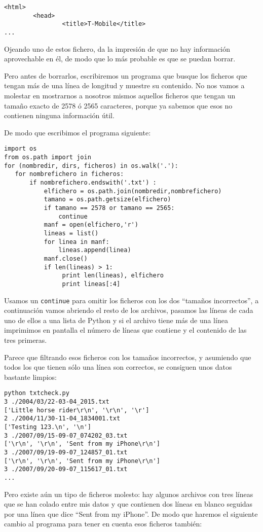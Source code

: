 \beforeverb
\begin{verbatim}
<html>
        <head>
                <title>T-Mobile</title>
...
\end{verbatim}
\afterverb
%
Ojeando uno de estos fichero, da la impresión de que no hay información aprovechable
en él, de modo que lo más probable es que se puedan borrar.

Pero antes de borrarlos, escribiremos un programa que busque los ficheros
que tengan más de una línea de longitud y muestre su contenido.
No nos vamos a molestar en mostrarnos a nosotros mismos aquellos ficheros que tengan
un tamaño exacto de 2578 ó 2565 caracteres, porque ya sabemos que esos no contienen
ninguna información útil.

De modo que escribimos el programa siguiente:

\beforeverb
\begin{verbatim}
import os
from os.path import join
for (nombredir, dirs, ficheros) in os.walk('.'):
   for nombrefichero in ficheros:
       if nombrefichero.endswith('.txt') :
           elfichero = os.path.join(nombredir,nombrefichero)
           tamano = os.path.getsize(elfichero)
           if tamano == 2578 or tamano == 2565:
               continue
           manf = open(elfichero,'r')
           lineas = list()
           for linea in manf:
               lineas.append(linea)
           manf.close()
           if len(lineas) > 1:
                print len(lineas), elfichero
                print lineas[:4]
\end{verbatim}
\afterverb
%
Usamos un {\tt continue} para omitir los ficheros con los dos
``tamaños incorrectos'', a continuación vamos abriendo el resto de los archivos,
pasamos las líneas de cada uno de ellos a una lista de Python
y si el archivo tiene más de una línea imprimimos
en pantalla el número de líneas que contiene y el contenido
de las tres primeras.

Parece que filtrando esos ficheros con los tamaños incorrectos, y asumiendo
que todos los que tienen sólo una línea son correctos, se
consiguen unos datos bastante limpios:

\beforeverb
\begin{verbatim}
python txtcheck.py 
3 ./2004/03/22-03-04_2015.txt
['Little horse rider\r\n', '\r\n', '\r']
2 ./2004/11/30-11-04_1834001.txt
['Testing 123.\n', '\n']
3 ./2007/09/15-09-07_074202_03.txt
['\r\n', '\r\n', 'Sent from my iPhone\r\n']
3 ./2007/09/19-09-07_124857_01.txt
['\r\n', '\r\n', 'Sent from my iPhone\r\n']
3 ./2007/09/20-09-07_115617_01.txt
...
\end{verbatim}
\afterverb
%
Pero existe aún un tipo de ficheros molesto:
hay algunos archivos con tres líneas que se han
colado entre mis datos y que contienen
dos líneas en blanco seguidas por una línea que dice
``Sent from my iPhone''. De modo que haremos el siguiente cambio
al programa para tener en cuenta esos ficheros también:

